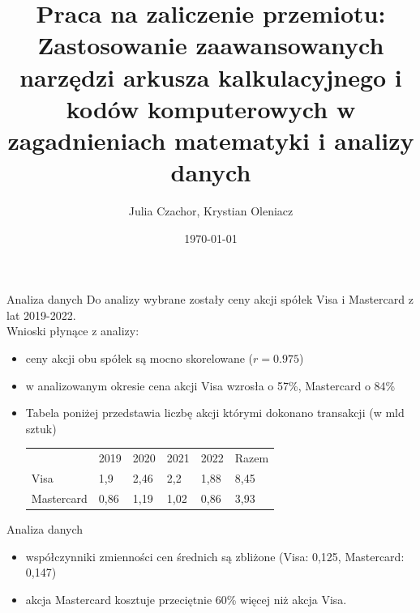 \documentclass{beamer}
\title{Praca na zaliczenie przemiotu: Zastosowanie zaawansowanych narzędzi arkusza kalkulacyjnego i kodów komputerowych w zagadnieniach matematyki i analizy danych}
\date{\today}
\author{Julia Czachor, Krystian Oleniacz}
\begin{document}
  \maketitle
  \begin{frame}{Analiza danych}
    Do analizy wybrane zostały ceny akcji spółek Visa i Mastercard z lat 2019-2022. \\
    Wnioski płynące z analizy:
    \begin{itemize}
      \item ceny akcji obu spółek są mocno skorelowane ($r  = 0.975$)
      \item w analizowanym okresie cena akcji Visa wzrosła o 57\%, Mastercard o 84\%
      \item Tabela poniżej przedstawia liczbę akcji którymi dokonano transakcji (w mld sztuk)
      \begin{table}[]
        \begin{tabular}{llllll}
                   & 2019 & 2020 & 2021 & 2022 & Razem \\
        Visa       & 1,9  & 2,46 & 2,2  & 1,88 & 8,45  \\
        Mastercard & 0,86 & 1,19 & 1,02 & 0,86 & 3,93 
        \end{tabular}
        \end{table}
    \end{itemize}
  \end{frame}

\begin{frame}{Analiza danych}
  \begin{itemize}
    \item współczynniki zmienności cen średnich są zbliżone (Visa:  0,125, Mastercard: 0,147)
    \item akcja Mastercard kosztuje przeciętnie 60\% więcej niż akcja Visa.
  \end{itemize}
\end{frame}
\end{document}
